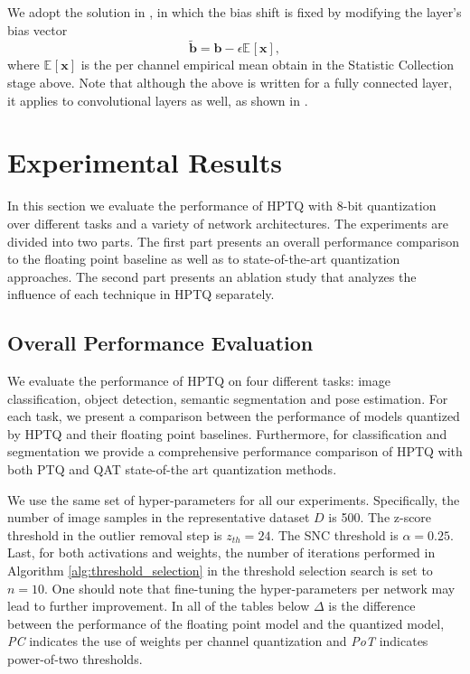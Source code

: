 \documentclass{article}
\newcommand{\vectorsym}[1]{\bm{#1}}
\newcommand{\expectation}[2]{\mathbb{E}_{#2}\left[#1\right]}
\begin{document}
We adopt the solution in \cite{nagel2019data}, in which the bias shift is fixed by modifying the layer's bias vector
\begin{equation}
\tilde{\vectorsym{b}}=\vectorsym{b}-\epsilon\expectation{\vectorsym{x}}{},
\end{equation}
where $\expectation{\vectorsym{x}}{}$ is the per channel empirical mean obtain in the Statistic Collection stage above. 
Note that although the above is written for a fully connected layer, it applies to convolutional layers as well, as shown in \cite{nagel2019data}.


 \section{Experimental Results}\label{sec:experimental}
In this section we evaluate the performance of HPTQ with 8-bit quantization over different tasks and a variety of network architectures. 
The experiments are divided into two parts. The first part presents an overall performance comparison to the floating point baseline as well as to state-of-the-art quantization approaches. The second part presents an ablation study that analyzes the influence of each technique in HPTQ separately.





\subsection{Overall Performance Evaluation}
We evaluate the performance of HPTQ on four different tasks: image classification, object detection, semantic segmentation and pose estimation.
For each task, we present a comparison between the performance of models quantized by HPTQ and their floating point baselines. Furthermore, for classification and segmentation we provide a comprehensive performance comparison of HPTQ with both PTQ and QAT state-of-the art quantization methods.

We use the same set of hyper-parameters for all our experiments.
Specifically, the number of image samples in the representative dataset $D$ is 500. 
The z-score threshold in the outlier removal step is $z_{th}=24$.
The SNC threshold is $\alpha=0.25$. 
Last, for both activations and weights, the number of iterations performed in Algorithm \ref{alg:threshold_selection} in the threshold selection search is set to $n=10$. One should note that fine-tuning the hyper-parameters per network may lead to further improvement.
In all of the tables below $\Delta$ is the difference between the performance of the floating point model and the quantized model, \textit{PC} indicates the use of weights per channel quantization and \textit{PoT} indicates power-of-two thresholds.
\end{document}
